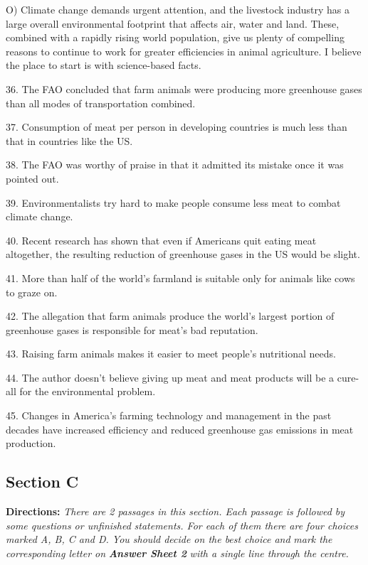 \documentclass[UTF8,11pt]{ctexart}
\begin{document}
O) Climate change demands urgent attention, and the livestock industry has a large overall environmental footprint that affects air, water and land. These, combined with a rapidly rising world population, give us plenty of compelling reasons to continue to work for greater efficiencies in animal agriculture. I believe the place to start is with science-based facts.


36. The FAO concluded that farm animals were producing more greenhouse gases than all modes of transportation combined.


37. Consumption of meat per person in developing countries is much less than that in countries like the US.


38. The FAO was worthy of praise in that it admitted its mistake once it was pointed out.


39. Environmentalists try hard to make people consume less meat to combat climate change.


40. Recent research has shown that even if Americans quit eating meat altogether, the resulting reduction of greenhouse gases in the US would be slight.


41. More than half of the world’s farmland is suitable only for animals like cows to graze on.


42. The allegation that farm animals produce the world’s largest portion of greenhouse gases is responsible for meat’s bad reputation.


43. Raising farm animals makes it easier to meet people’s nutritional needs.


44. The author doesn’t believe giving up meat and meat products will be a cure-all for the environmental problem.


45. Changes in America’s farming technology and management in the past decades have increased efficiency and reduced greenhouse gas emissions in meat production.


\subsection*{\textbf{Section C}}


\textbf{Directions: }\textit{There are 2 passages in this section. Each passage is followed by some questions or unfinished} \textit{statements. For each of them there are four choices marked A, B, C and D. You should decide on the best choice and} \textit{mark the corresponding letter on }\textbf{\textit{Answer Sheet 2}}\textit{ with a single line through the centre.}
\end{document}
